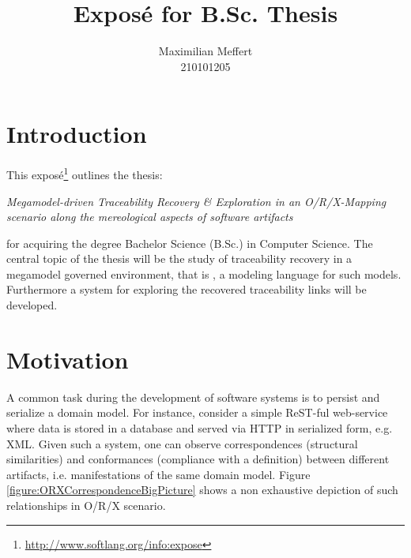 \documentclass[runningheads,a4paper]{llncs}
\title{Exposé for B.Sc. Thesis}
\subtitle{\thesis}
\author{Maximilian Meffert\\210101205}
\institute{University of Koblenz-Landau}
\newcommand{\megal}{\text{MegaL}}
\newcommand{\thesis}{Megamodel-driven Traceability Recovery \& Exploration in an O/R/X-Mapping scenario along the mereological aspects of software artifacts}
\begin{document}
\maketitle
%


\section{Introduction}
This exposé\footnote{\url{http://www.softlang.org/info:expose}} outlines the thesis:
\begin{center}
\it
\thesis
\end{center}
for acquiring the degree Bachelor Science (B.Sc.) in Computer Science.
The central topic of the thesis will be the study of traceability recovery in a megamodel governed environment, that is \megal, a modeling language for such models. Furthermore a system for exploring the recovered traceability links will be developed.



\section{Motivation}
\label{section:Motivation}
A common task during the development of software systems is to persist and serialize a domain model.
For instance, consider a simple ReST-ful web-service where data is stored in a database and served via HTTP in serialized form, e.g. XML.
Given such a system, one can observe correspondences (structural similarities) and conformances (compliance with a definition) between different artifacts, i.e. manifestations of the same domain model.
Figure \ref{figure:ORXCorrespondenceBigPicture} shows a non exhaustive depiction of such relationships in O/R/X scenario.
\end{document}
